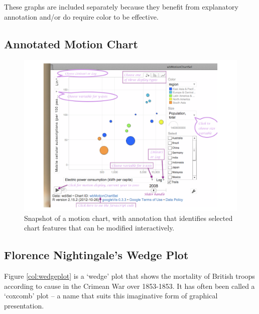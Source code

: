 






These graphs are included separately because they benefit from
explanatory annotation and/or do require color to be effective.

\subsection*{Annotated Motion Chart}

\begin{figure}[h]
\vspace*{-6pt}
\centerline{\includegraphics[scale=0.88]{colorArt/motionchart}}%
\caption{Snapshot of a motion chart, with annotation
  that identifies selected chart features that can be
  modified interactively.\label{col:mchart}}
\vspace*{-18pt}
\end{figure}

\newpage
\subsection*{Florence Nightingale's Wedge Plot}\label{sec:wedge}


Figure \ref{col:wedgeplot} is a `wedge' plot that shows the
mortality of British troops according to cause in the Crimean War over
1853-1853. It has often been called a `coxcomb' plot -- a name that
suits this imaginative form of graphical presentation.

